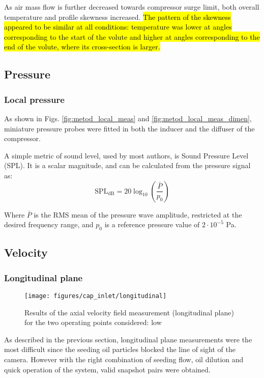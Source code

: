 As air mass flow is further decreased towards compressor surge limit, both overall temperature and profile skewness increased. \hl{The pattern of the skewness appeared to be similar at all conditions: temperature was lower at angles corresponding to the start of the volute and higher at angles corresponding to the end of the volute, where its cross-section is larger.}

\subsection{Pressure}
\label{sub:pressure}

\subsubsection{Local pressure}

As shown in Figs. \ref{fig:metod_local_meas} and \ref{fig:metod_local_meas_dimen}, miniature pressure probes were fitted in both the inducer and the diffuser of the compressor.

A simple metric of sound level, used by most authors, is Sound Pressure Level (SPL). It is a scalar magnitude, and can be calculated from the pressure signal as:
\begin{equation}
  \text{SPL}_\text{dB} = 20\log_{10}\left(\frac{\bar P}{p_0}\right)
\end{equation}

Where $\bar P$ is the RMS mean of the pressure wave amplitude, restricted at the desired frequency range, and $p_0$ is a reference pressure value of $2\cdot 10^{-5}$ Pa.

\subsection{Velocity}
\label{sub:velocity}

\subsubsection{Longitudinal plane}

\begin{figure*}[htb!]
\centering
\texttt{[image: figures/cap\_inlet/longitudinal]}
\caption{Results of the axial velocity field measurement (longitudinal plane) for the two operating points considered: low}
\label{fig:longitudinal}
\end{figure*}

As described in the previous section, longitudinal plane measurements were the most difficult since the seeding oil particles blocked the line of sight of the camera. However with the right combination of seeding flow, oil dilution and quick operation of the system, valid snapshot pairs were obtained.

